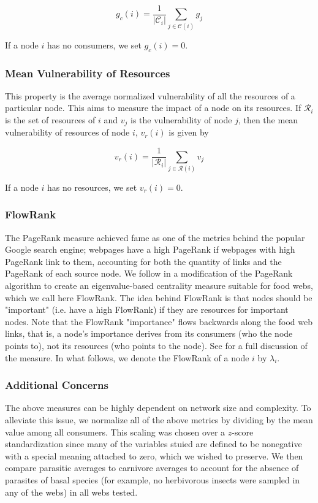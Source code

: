 \documentclass[../dissertation.tex]{subfiles}
\begin{document}
\begin{equation} 
    g_c(i) = \frac{1}{|\mathcal{C}_i|}\sum_{j\in\mathcal{C}(i)}g_j
\label{eq:MeanGeneralityConsumers} 
\end{equation}

If a node $i$ has no consumers, we set $g_c(i)=0$. 


\subsubsection{Mean Vulnerability of Resources} This property is the average
normalized vulnerability of all the resources of a particular node. This aims
to measure the impact of a node on its resources. If $\mathcal{R}_i$ is the
set of resources of $i$ and $v_j$ is the vulnerability of node $j$, then the
mean vulnerability of resources of node $i$, $v_r(i)$ is given by

\begin{equation} 
    v_r(i) = \frac{1}{|\mathcal{R}_i|}\sum_{j\in\mathcal{R}(i)}v_j
\label{eq:MeanVulnerabilityResources}  
\end{equation}

If a node $i$ has no resources, we set $v_r(i)=0$.

\newcommand\FR{\mathit{FR}} 

\subsubsection{FlowRank} The PageRank measure achieved fame as one of the
metrics behind the popular Google search engine; webpages have a high PageRank
if webpages with high PageRank link to them, accounting for both the quantity
of links and the PageRank of each source node.  We follow \cite{Allesina2009}
in a modification of the PageRank algorithm to create an eigenvalue-based
centrality measure suitable for food webs, which we call here FlowRank. The
idea behind FlowRank is that nodes should be "important" (i.e. have a high
FlowRank) if they are resources for important nodes. Note that the FlowRank
"importance" flows backwards along the food web links, that is, a node's
importance derives from its consumers (who the node points to), not its resources
(who points to the node). See \cite{Allesina2009} for a full discussion of the
measure. In what follows, we denote the FlowRank of a node $i$ by
$\lambda_i$.

\subsubsection{Additional Concerns} The above measures can be highly dependent
on network size and complexity. To alleviate this issue, we normalize all of
the above metrics by dividing by the mean value among all consumers. This
scaling was chosen over a $z$-score standardization since many of the variables
stuied are defined to be nonegative with a special meaning attached to zero,
which we wished to preserve. We then compare parasitic averages to carnivore
averages to account for the absence of parasites of basal species (for example,
no herbivorous insects were sampled in any of the webs) in all webs
tested.
\end{document}

